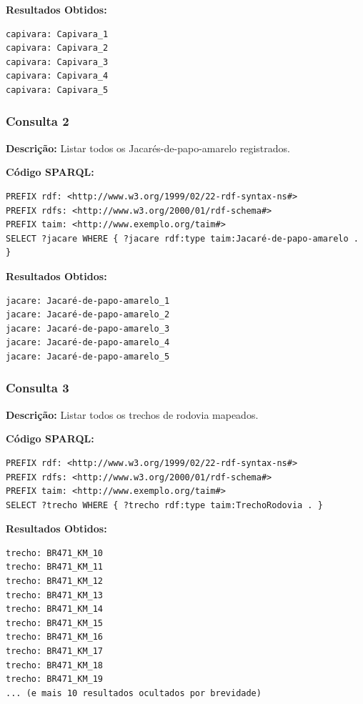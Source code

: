 \documentclass[12pt,a4paper]{article}
\begin{document}
\textbf{Resultados Obtidos:}
\begin{lstlisting}
capivara: Capivara_1
capivara: Capivara_2
capivara: Capivara_3
capivara: Capivara_4
capivara: Capivara_5
\end{lstlisting}

\vspace{1cm}
\subsubsection*{Consulta 2}

\textbf{Descrição:} Listar todos os Jacarés-de-papo-amarelo registrados.

\textbf{Código SPARQL:}
\begin{lstlisting}
PREFIX rdf: <http://www.w3.org/1999/02/22-rdf-syntax-ns#>
PREFIX rdfs: <http://www.w3.org/2000/01/rdf-schema#>
PREFIX taim: <http://www.exemplo.org/taim#>
SELECT ?jacare WHERE { ?jacare rdf:type taim:Jacaré-de-papo-amarelo . }
\end{lstlisting}

\textbf{Resultados Obtidos:}
\begin{lstlisting}
jacare: Jacaré-de-papo-amarelo_1
jacare: Jacaré-de-papo-amarelo_2
jacare: Jacaré-de-papo-amarelo_3
jacare: Jacaré-de-papo-amarelo_4
jacare: Jacaré-de-papo-amarelo_5
\end{lstlisting}

\vspace{1cm}
\subsubsection*{Consulta 3}

\textbf{Descrição:} Listar todos os trechos de rodovia mapeados.

\textbf{Código SPARQL:}
\begin{lstlisting}
PREFIX rdf: <http://www.w3.org/1999/02/22-rdf-syntax-ns#>
PREFIX rdfs: <http://www.w3.org/2000/01/rdf-schema#>
PREFIX taim: <http://www.exemplo.org/taim#>
SELECT ?trecho WHERE { ?trecho rdf:type taim:TrechoRodovia . }
\end{lstlisting}

\textbf{Resultados Obtidos:}
\begin{lstlisting}
trecho: BR471_KM_10
trecho: BR471_KM_11
trecho: BR471_KM_12
trecho: BR471_KM_13
trecho: BR471_KM_14
trecho: BR471_KM_15
trecho: BR471_KM_16
trecho: BR471_KM_17
trecho: BR471_KM_18
trecho: BR471_KM_19
... (e mais 10 resultados ocultados por brevidade)
\end{lstlisting}
\end{document}
